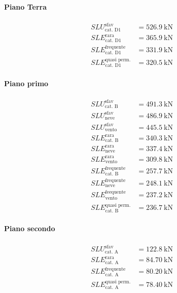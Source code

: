 \paragraph*{Piano Terra} 
\begin{align*} 
	SLU^{\text{sfav}}_{\text{cat. D1}}		&= \SI{526.9}{\kilo\newton} \\	
	SLE^{\text{rara}}_{\text{cat. D1}} 		&= \SI{365.9}{\kilo\newton} \\
	SLE^{\text{frequente}}_{\text{cat. D1}} &= \SI{331.9}{\kilo\newton} \\
	SLE^{\text{quasi perm.}}_{\text{cat. D1}}&= \SI{320.5}{\kilo\newton}
\end{align*}
\paragraph*{Piano primo}
\begin{align*} 
	SLU^{\text{sfav}}_{\text{cat. B}}		&= \SI{491.3}{\kilo\newton} \\
	SLU^{\text{sfav}}_{\text{neve}}	 	    &= \SI{486.9}{\kilo\newton} \\
	SLU^{\text{sfav}}_{\text{vento}}		&= \SI{445.5}{\kilo\newton} \\	
	SLE^{\text{rara}}_{\text{cat. B}} 		&= \SI{340.3}{\kilo\newton} \\
	SLE^{\text{rara}}_{\text{neve}} 		&= \SI{337.4}{\kilo\newton} \\
	SLE^{\text{rara}}_{\text{vento}} 		&= \SI{309.8}{\kilo\newton} \\
	SLE^{\text{frequente}}_{\text{cat. B}} 	&= \SI{257.7}{\kilo\newton} \\
	SLE^{\text{frequente}}_{\text{neve}} 	&= \SI{248.1}{\kilo\newton} \\
	SLE^{\text{feequente}}_{\text{vento}}   &= \SI{237.2}{\kilo\newton} \\
	SLE^{\text{quasi perm.}}_{\text{cat. B}}&= \SI{236.7}{\kilo\newton}
\end{align*}
\paragraph*{Piano secondo}
\begin{align*} 
	SLU^{\text{sfav}}_{\text{cat. A}}		&= \SI{122.8}{\kilo\newton} \\	
	SLE^{\text{rara}}_{\text{cat. A}} 		&= \SI{84.70}{\kilo\newton} \\
	SLE^{\text{frequente}}_{\text{cat. A}} 	&= \SI{80.20}{\kilo\newton} \\
	SLE^{\text{quasi perm.}}_{\text{cat. A}}&= \SI{78.40}{\kilo\newton}
\end{align*}
